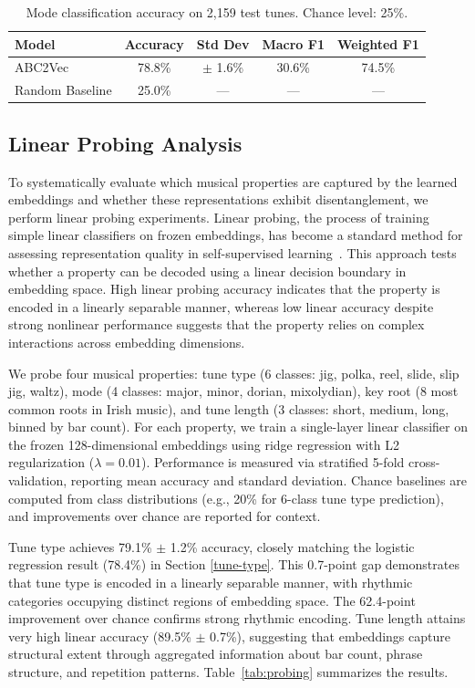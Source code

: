 \documentclass[]{interact}
\theoremstyle{plain}
\theoremstyle{definition}
\theoremstyle{remark}
\begin{document}
\begin{table}[!htb]
\centering
\caption{Mode classification accuracy on 2,159 test tunes. Chance level: 25\%.}
\label{tab:mode}
\begin{tabular}{lcccc}
\toprule
\textbf{Model} & \textbf{Accuracy} & \textbf{Std Dev} & \textbf{Macro F1} & \textbf{Weighted F1} \\
\midrule
ABC2Vec & 78.8\% & $\pm$ 1.6\% & 30.6\% & 74.5\% \\
Random Baseline & 25.0\% & --- & --- & --- \\
\bottomrule
\end{tabular}
\end{table}

\subsection{Linear Probing Analysis}

To systematically evaluate which musical properties are captured by the learned embeddings and whether these representations exhibit disentanglement, we perform linear probing experiments. Linear probing, the process of training simple linear classifiers on frozen embeddings, has become a standard method for assessing representation quality in self-supervised learning~\cite{LinearProbing2020}. This approach tests whether a property can be decoded using a linear decision boundary in embedding space. High linear probing accuracy indicates that the property is encoded in a linearly separable manner, whereas low linear accuracy despite strong nonlinear performance suggests that the property relies on complex interactions across embedding dimensions.

We probe four musical properties: tune type (6 classes: jig, polka, reel, slide, slip jig, waltz), mode (4 classes: major, minor, dorian, mixolydian), key root (8 most common roots in Irish music), and tune length (3 classes: short, medium, long, binned by bar count). For each property, we train a single-layer linear classifier on the frozen 128-dimensional embeddings using ridge regression with L2 regularization ($\lambda = 0.01$). Performance is measured via stratified 5-fold cross-validation, reporting mean accuracy and standard deviation. Chance baselines are computed from class distributions (e.g., 20\% for 6-class tune type prediction), and improvements over chance are reported for context.

Tune type achieves 79.1\% $\pm$ 1.2\% accuracy, closely matching the logistic regression result (78.4\%) in Section \ref{tune-type}. This 0.7-point gap demonstrates that tune type is encoded in a linearly separable manner, with rhythmic categories occupying distinct regions of embedding space. The 62.4-point improvement over chance confirms strong rhythmic encoding. Tune length attains very high linear accuracy (89.5\% $\pm$ 0.7\%), suggesting that embeddings capture structural extent through aggregated information about bar count, phrase structure, and repetition patterns. Table~\ref{tab:probing} summarizes the results. 
\end{document}

